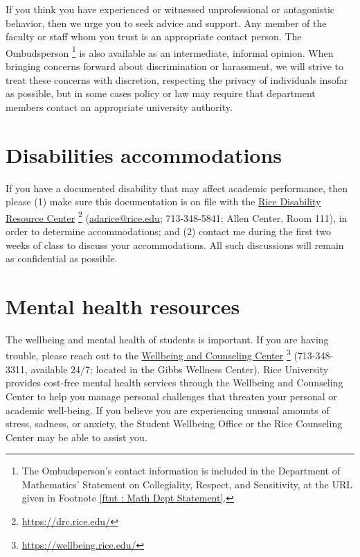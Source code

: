 If you think you have experienced or witnessed unprofessional or antagonistic behavior, then we urge you to seek advice and support. Any member of the faculty or staff whom you trust is an appropriate contact person. The Ombudsperson%
\footnote{The Ombudsperson's contact information is included in the Department of Mathematics' Statement on Collegiality, Respect, and Sensitivity, at the URL given in Footnote \ref{ftnt : Math Dept Statement}.} %
is also available as an intermediate, informal opinion. When bringing concerns forward about discrimination or harassment, we will strive to treat these concerns with discretion, respecting the privacy of individuals insofar as possible, but in some cases policy or law may require that department members contact an appropriate university authority.




%
%
%
%

\section{Disabilities accommodations}

If you have a documented disability that may affect academic performance, then please (1) make sure this documentation is on file with the \href{https://drc.rice.edu/}{Rice Disability Resource Center}%
\footnote{\href{https://drc.rice.edu/}{https://drc.rice.edu/}} %
(\href{mailto:adarice@rice.edu}{adarice@rice.edu}; 713-348-5841; Allen Center, Room 111), in order to determine accommodations; and (2) contact me during the first two weeks of class to discuss your accommodations. All such discussions will remain as confidential as possible.





%
%
%
%

\section{Mental health resources}

The wellbeing and mental health of students is important. If you are having trouble, please reach out to the \href{https://wellbeing.rice.edu/}{Wellbeing and Counseling Center}%
\footnote{\href{https://wellbeing.rice.edu/}{https://wellbeing.rice.edu/}} %
(713-348-3311, available 24/7; located in the Gibbs Wellness Center). Rice University provides cost-free mental health services through the Wellbeing and Counseling Center to help you manage personal challenges that threaten your personal or academic well-being. If you believe you are experiencing unusual amounts of stress, sadness, or anxiety, the Student Wellbeing Office or the Rice Counseling Center may be able to assist you.




